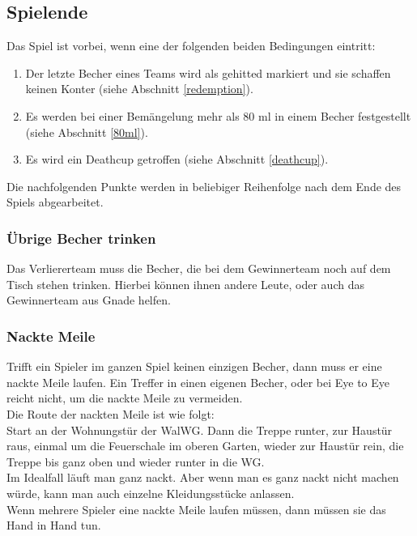 \documentclass[a5paper, 12pt]{book}
\begin{document}
\subsection{Spielende}\label{spielende}
Das Spiel ist vorbei, wenn eine der folgenden beiden Bedingungen eintritt:
\begin{enumerate}[(1)]
    \item Der letzte Becher eines Teams wird als gehitted markiert und sie schaffen keinen Konter (siehe Abschnitt \ref{redemption}).
    \item Es werden bei einer Bemängelung mehr als 80 ml in einem Becher festgestellt (siehe Abschnitt \ref{80ml}).
    \item Es wird ein Deathcup getroffen (siehe Abschnitt \ref{deathcup}).
\end{enumerate}
Die nachfolgenden Punkte werden in beliebiger Reihenfolge nach dem Ende des Spiels abgearbeitet.
\subsubsection{Übrige Becher trinken}\label{übrigebechertrinken}
Das Verliererteam muss die Becher, die bei dem Gewinnerteam noch auf dem Tisch stehen trinken. Hierbei können ihnen andere Leute, oder auch das Gewinnerteam aus Gnade helfen.
\subsubsection{Nackte Meile}\label{nacktemeile}
Trifft ein Spieler im ganzen Spiel keinen einzigen Becher, dann muss er eine nackte Meile laufen. Ein Treffer in einen eigenen Becher, oder bei Eye to Eye reicht nicht, um die nackte Meile zu vermeiden.\\
Die Route der nackten Meile ist wie folgt:\\
Start an der Wohnungstür der WalWG. Dann die Treppe runter, zur Haustür raus, einmal um die Feuerschale im oberen Garten, wieder zur Haustür rein, die Treppe bis ganz oben und wieder runter in die WG.\\
Im Idealfall läuft man ganz nackt. Aber wenn man es ganz nackt nicht machen würde, kann man auch einzelne Kleidungsstücke anlassen.\\
Wenn mehrere Spieler eine nackte Meile laufen müssen, dann müssen sie das Hand in Hand tun. 
\end{document}
